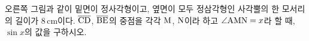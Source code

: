 \noindent\begin{minipage}[t]{0.58\linewidth}\vspace{0pt}\raggedright 오른쪽 그림과 같이 밑면이 정사각형이고, 옆면이 모두 정삼각형인 사각뿔의 한 모서리의 길이가 $8\,\mathrm{cm}$이다. $\overline{\mathrm{CD}}$, $\overline{\mathrm{BE}}$의 중점을 각각 $\mathrm{M}$, $\mathrm{N}$이라 하고 $\angle\mathrm{AMN}=x$라 할 때, $\sin x$의 값을 구하시오.\end{minipage}\hfill\begin{minipage}[t]{0.4\linewidth}\vspace{0pt}\centering \resizebox{\ifdim\width>\linewidth\linewidth\else\width\fi}{!}{}\end{minipage}\par
